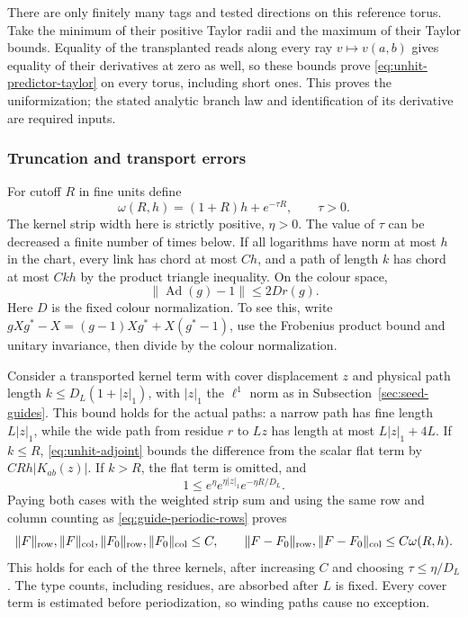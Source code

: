 There are only finitely many tags and tested directions on this
reference torus. Take the minimum of their positive Taylor radii and
the maximum of their Taylor bounds. Equality of the transplanted
reads along every ray $v\mapsto v(a,b)$ gives equality of their
derivatives at zero as well, so these bounds prove
\eqref{eq:unhit-predictor-taylor} on every torus, including short
ones. This proves the uniformization; the stated analytic branch law
and identification of its derivative are required inputs.

\subsubsection{Truncation and transport errors}
For cutoff $R$ in fine units define
\[
 \omega(R,h)=(1+R)h+e^{-\tau R},\qquad \tau>0.
\]
The kernel strip width here is strictly positive, $\eta>0$.
The value of $\tau$ can be decreased a finite number of times below.
If all logarithms have norm at most $h$ in the chart, every link has
chord at most $Ch$, and a path of length $k$ has chord at most $Ckh$
by the product triangle inequality. On the colour space,
\begin{equation}\label{eq:unhit-adjoint}
 \|\operatorname{Ad}(g)-1\|\le2D r(g).
\end{equation}
Here $D$ is the fixed colour normalization. To see this, write
$gXg^*-X=(g-1)Xg^*+X(g^*-1)$, use the Frobenius product bound and
unitary invariance, then divide by the colour normalization.

Consider a transported kernel term with cover displacement $z$ and
physical path length $k\le D_L(1+|z|_1)$, with $|z|_1$ the $\ell^1$
norm as in Subsection~\ref{sec:seed-guides}. This bound holds for the
actual paths: a narrow path has fine length $L|z|_1$, while the wide
path from residue $r$ to $Lz$ has length at most $L|z|_1+4L$.
If $k\le R$, \eqref{eq:unhit-adjoint} bounds the difference from
the scalar flat term by $C Rh|K_{ab}(z)|$. If $k>R$, the flat term
is omitted, and
\[
 1\le e^\eta e^{\eta|z|_1}e^{-\eta R/D_L}.
\]
Paying both cases with the weighted strip sum and using the same
row and column counting as \eqref{eq:guide-periodic-rows} proves
\begin{equation}\label{eq:unhit-kernel-near}
 \|F\|_{\rm row},\|F\|_{\rm col},
 \|F_0\|_{\rm row},\|F_0\|_{\rm col}\le C,
 \qquad
 \|F-F_0\|_{\rm row},\|F-F_0\|_{\rm col}
       \le C\omega(R,h).
\end{equation}
This holds for each of the three kernels, after increasing $C$ and
choosing $\tau\le\eta/D_L$. The type counts, including residues,
are absorbed after $L$ is fixed. Every cover term is estimated before
periodization, so winding paths cause no exception.

